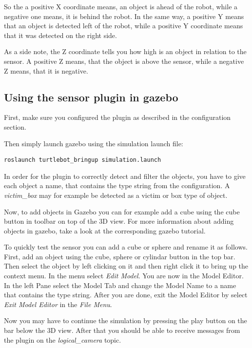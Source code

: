 So the a positive X coordinate means, an object is ahead of the robot, while a negative one means, it is behind the robot. In the same way, a positive Y means that an object is detected left of the robot, while a positive Y coordinate means that it was detected on the right side.

As a side note, the Z coordinate tells you how high is an object in relation to the sensor. A positive Z means, that the object is above the sensor, while a negative Z means, that it is negative.

\subsection{Using the sensor plugin in gazebo}

First, make sure you configured the plugin as described in the configuration section.

Then simply launch gazebo using the simulation launch file:

\begin{verbatim}
roslaunch turtlebot_bringup simulation.launch
\end{verbatim}

In order for the plugin to correctly detect and filter the objects, you have to give each object a name, that contains the type string from the configuration. A \textit{victim\_box} may for example be detected  as a victim or box type of object.

Now, to add objects in Gazebo you can for example add a cube using the cube button in toolbar on top of the 3D view. For more information about adding objects in gazebo, take a look at the corresponding gazebo tutorial.

To quickly test the sensor you can add a cube or sphere and rename it as follows.  First, add an object using the cube, sphere or cylindar button in the top bar. Then select the object by left clicking on it and then right click it to bring up the context menu. In the menu select \textit{Edit Model}. You are now in the Model Editor. In the left Pane select the Model Tab and change the Model Name to a name that contains the type string. After you are done, exit the Model Editor by select \textit{Exit Model Editor} in the \textit{File Menu}.

Now you may have to continue the simulation by pressing the play button on the bar below the 3D view. After that you should be able to receive messages from the plugin on the \textit{logical\_camera} topic.